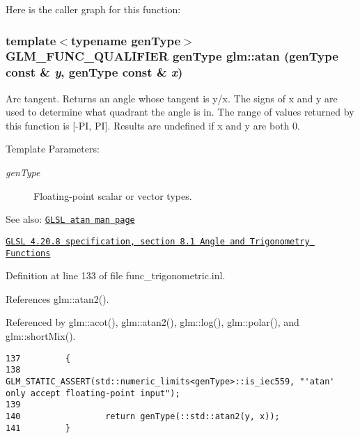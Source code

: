 Here is the caller graph for this function:\hypertarget{group__core__func__trigonometric_gb89f4e2a1ea1426dc87ab3a06901b68a}{
\subsubsection[atan]{\setlength{\rightskip}{0pt plus 5cm}template$<$typename genType$>$ GLM\_\-FUNC\_\-QUALIFIER genType glm::atan (genType const \& {\em y}, \/  genType const \& {\em x})}}
\label{group__core__func__trigonometric_gb89f4e2a1ea1426dc87ab3a06901b68a}


Arc tangent. Returns an angle whose tangent is y/x. The signs of x and y are used to determine what quadrant the angle is in. The range of values returned by this function is \mbox{[}-PI, PI\mbox{]}. Results are undefined if x and y are both 0.

\begin{Desc}
\item[Template Parameters:]
\begin{description}
\item[{\em genType}]Floating-point scalar or vector types.\end{description}
\end{Desc}
\begin{Desc}
\item[See also:]\href{http://www.opengl.org/sdk/docs/manglsl/xhtml/atan.xml}{\tt GLSL atan man page} 

\href{http://www.opengl.org/registry/doc/GLSLangSpec.4.20.8.pdf}{\tt GLSL 4.20.8 specification, section 8.1 Angle and Trigonometry Functions} \end{Desc}


Definition at line 133 of file func\_\-trigonometric.inl.

References glm::atan2().

Referenced by glm::acot(), glm::atan2(), glm::log(), glm::polar(), and glm::shortMix().

\begin{Code}\begin{verbatim}137         {
138                 GLM_STATIC_ASSERT(std::numeric_limits<genType>::is_iec559, "'atan' only accept floating-point input");
139 
140                 return genType(::std::atan2(y, x));
141         }
\end{verbatim}
\end{Code}




